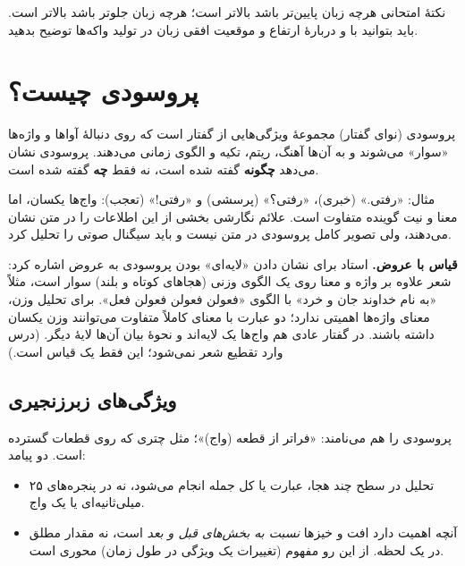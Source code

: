 \begin{exambox}{نکتهٔ امتحانی}
هرچه زبان پایین‌تر باشد  بالاتر است؛ هرچه زبان جلوتر باشد  بالاتر است. باید بتوانید با  و  دربارهٔ ارتفاع و موقعیت افقی زبان در تولید واکه‌ها توضیح بدهید.
\end{exambox}

\section{پروسودی چیست؟}

\begin{definitionbox}{پروسودی (نوای گفتار)}
 مجموعهٔ ویژگی‌هایی از گفتار است که روی دنبالهٔ آواها و واژه‌ها «سوار» می‌شوند و به آن‌ها آهنگ، ریتم، تکیه و الگوی زمانی می‌دهند. پروسودی نشان می‌دهد \textbf{چگونه} گفته شده است، نه فقط \textbf{چه} گفته شده است.
\end{definitionbox}

مثال: «رفتی.» (خبری)، «رفتی؟» (پرسشی) و «رفتی!» (تعجب): واج‌ها یکسان، اما معنا و نیت گوینده متفاوت است. علائم نگارشی بخشی از این اطلاعات را در متن نشان می‌دهند، ولی تصویر کامل پروسودی در متن نیست و باید سیگنال صوتی را تحلیل کرد.

\textbf{قیاس با عروض.} استاد برای نشان دادن «لایه‌ای» بودن پروسودی به عروض اشاره کرد: شعر علاوه بر واژه و معنا روی یک الگوی وزنی (هجاهای کوتاه و بلند) سوار است، مثلاً «به نام خداوند جان و خرد» با الگوی «فعولن فعولن فعولن فعل». برای تحلیل وزن، معنای واژه‌ها اهمیتی ندارد؛ دو عبارت با معنای کاملاً متفاوت می‌توانند وزن یکسان داشته باشند. در گفتار عادی هم واج‌ها یک لایه‌اند و نحوهٔ بیان آن‌ها لایهٔ دیگر. (درس وارد تقطیع شعر نمی‌شود؛ این فقط یک قیاس است.)

\subsection{ویژگی‌های زبرزنجیری}
پروسودی را  هم می‌نامند: «فراتر از قطعه (واج)»؛ مثل چتری که روی قطعات گسترده است. دو پیامد:
\begin{itemize}
  \item تحلیل در سطح چند هجا، عبارت یا کل جمله انجام می‌شود، نه در پنجره‌های ۲۵ میلی‌ثانیه‌ای یا یک واج.
  \item آنچه اهمیت دارد افت و خیزها \emph{نسبت به بخش‌های قبل و بعد} است، نه مقدار مطلق در یک لحظه. از این رو مفهوم  (تغییرات یک ویژگی در طول زمان) محوری است.
\end{itemize}

